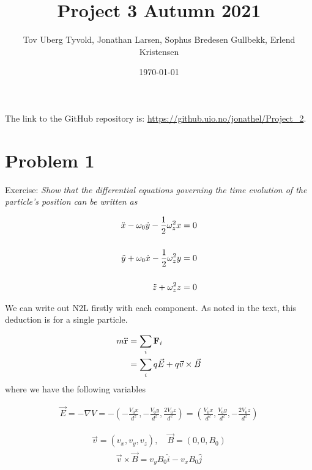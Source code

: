 \documentclass[english,notitlepage]{revtex4-1}  %
\begin{document}
\title{Project 3 Autumn 2021}      %
\author{Tov Uberg Tyvold, Jonathan Larsen, Sophus Bredesen Gullbekk, Erlend Kristensen}          %
\date{\today}                             %
\noaffiliation                            %

\maketitle 

The link to the GitHub repository is: \url{https://github.uio.no/jonathel/Project_2}.

\section*{Problem 1}

Exercise:
\textit{Show that the differential equations governing the time evolution of the particle's position can be written as}

\begin{align}
    \Ddot{x} - \omega_0 \Dot{y}- \frac{1}{2} \omega_z^2 x &= 0
    \\[0.2in]
    \Ddot{y} + \omega_0 \Dot{x}- \frac{1}{2} \omega_z^2 y &= 0
    \\[0.2in]
    \Ddot{z} + \omega_z^2 z &= 0
\end{align}

We can write out N2L firstly with each component. As noted in the text, this deduction is for a single particle.

\begin{align}
    m \bf{\Ddot{r}} &= \sum_i \textbf{F}_i
    \\
    &= \sum_i q \Vec{E} + q \Vec{v} \times \Vec{B}
\end{align}
where we have the following variables

\begin{align}
    \Vec{E} = - \nabla V = - \left( - \frac{V_0 x}{d^2}, - \frac{V_0 y}{d^2},\frac{2 V_0 z}{d^2} \right) = \left(\frac{V_0 x}{d^2}, \frac{V_0 y}{d^2}, -\frac{2 V_0 z}{d^2} \right)
\end{align}

\begin{align}
    \Vec{v} = (v_x, v_y, v_z), \quad \Vec{B} = (0,0, B_0)
\end{align}
\begin{align} 
    \Vec{v} \times \Vec{B} = v_y B_0 \hat{i} - v_x B_0 \hat{j}
\end{align}
\end{document}
